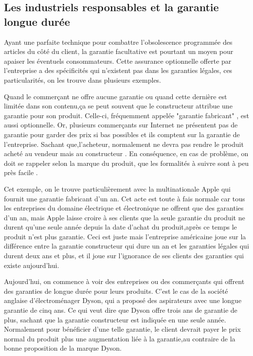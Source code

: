 \subsection{Les industriels responsables et la garantie longue durée}



Ayant une parfaite technique pour combattre l’obsolescence programmée des articles du côté du client, la garantie facultative est pourtant un moyen pour apaiser les éventuels consommateurs. Cette assurance optionnelle offerte par l'entreprise a des  spécificités qui n'existent pas dans les garanties légales, ces particularités, on les trouve dans plusieurs exemples.
 
Quand le commerçant ne offre aucune garantie ou quand cette dernière est limitée dans son contenu,ça se peut souvent que le constructeur attribue une garantie pour son produit. Celle-ci, fréquemment appelée "garantie fabricant" , est aussi optionnelle.
 Or, plusieurs commerçants sur Internet ne présentent pas de garantie pour  garder des prix si bas  possibles et ils comptent sur la garantie de l'entreprise. Sachant que,l'acheteur, normalement ne devra pas rendre le produit acheté au vendeur mais au constructeur . En conséquence, en cas de problème, on doit se rappeler selon la marque du produit, que les formalités à suivre sont à peu près facile .

Cet exemple, on le trouve particulièrement avec la multinationale Apple qui fournit une garantie fabricant d’un an. Cet acte est toute à fais normale car tous les entreprises du domaine électrique et électronique ne offrent que des garanties d’un an, mais Apple laisse croire à ses clients que la seule garantie du produit ne durent qu'une seule année depuis la date d'achat du produit,après ce temps le produit n'est plus garantie. Ceci est juste mais l'entreprise américaine joue sur la différence entre la garantie constructeur qui dure un an et les garanties légales qui durent deux ans et plus, et il joue sur l'ignorance de ses clients des garanties qui existe aujourd'hui.

Aujourd'hui, on commence à voir des entreprises ou des commerçants qui offrent des garanties de longue durée pour leurs produits.
 C'est le cas de la société anglaise d’électroménager Dyson, qui a proposé des aspirateurs avec une longue garantie de cinq ans. Ce qui veut dire que Dyson offre trois ans de garantie de plus, sachant que la garantie constructeur est indiquée en une seule année. Normalement pour bénéficier d'une telle garantie, le client devrait payer le prix normal du produit plus une augmentation liée à la garantie,au contraire de la bonne proposition de la marque Dyson. 


